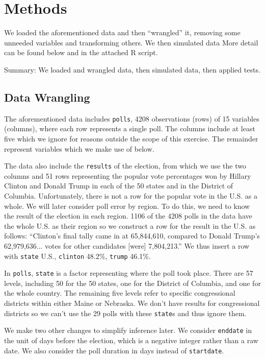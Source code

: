 \documentclass[11pt, oneside]{article}
\newcommand \Rcode[1]{{\texttt{\colorbox{codegray}{#1}}}}
\begin{document}
\section{Methods}

We loaded the aforementioned data and then ``wrangled'' it, removing some unneeded variables and transforming others. We then simulated data 
More detail can be found below and in the attached R script. 

Summary: We loaded and wrangled data, then simulated data, then applied tests. 

\subsection{Data Wrangling}

The aforementioned data includes \Rcode{polls}, 4208 observations (rows) of 15 variables (columns), where each row represents a single poll. The columns include at least five which we ignore for reasons outside the scope of this exercise. The remainder represent variables which we make use of below. 

The data also include the \Rcode{results} of the election, from which we use the two columns and 51 rows representing the popular vote percentages won by Hillary Clinton and Donald Trump in each of the 50 states and in the District of Columbia. Unfortunately, there is not a row for the popular vote in the U.S. as a whole. We will later consider poll error by region. To do this, we need to know the result of the election in each region. 1106 of the 4208 polls in the data have the whole U.S. as their region so we construct a row for the result in the U.S. as follows: ``Clinton's final tally came in at 65,844,610, compared to Donald Trump's 62,979,636... votes for other candidates [were] 7,804,213.'' \cite{time} We thus insert a row with \Rcode{state} U.S., \Rcode{clinton} 48.2\%, \Rcode{trump} 46.1\%.

In \Rcode{polls}, \Rcode{state} is a factor representing where the poll took place. There are 57 levels, including 50 for the 50 states, one for the District of Columbia, and one for the whole country. The remaining five levels refer to specific congressional districts within either Maine or Nebraska. We don't have results for congressional districts so we can't use the 29 polls with these \Rcode{state}s and thus ignore them.

We make two other changes to simplify inference later. We consider \Rcode{enddate} in the unit of days before the election, which is a negative integer rather than a raw date. We also consider the poll duration in days instead of \Rcode{startdate}. 
\end{document}
